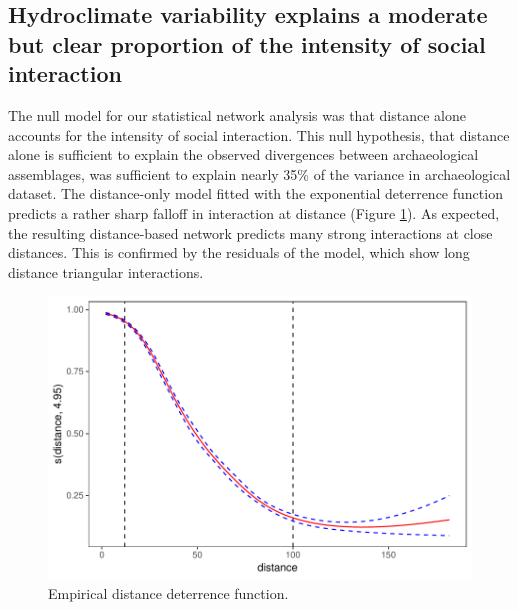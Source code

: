 \documentclass[10pt]{iopart}
\begin{document}



\subsection*{Hydroclimate variability explains a moderate but clear proportion of the intensity of social interaction}
The null model for our statistical network analysis was that distance alone accounts for the intensity of social interaction. This null hypothesis, that distance alone is sufficient to explain the observed divergences between archaeological assemblages, was sufficient to explain nearly 35\% of the variance in archaeological dataset. The distance-only model fitted with the exponential deterrence function predicts a rather sharp falloff in interaction at distance (Figure \ref{fig:distance}). As expected, the resulting distance-based network predicts many strong interactions at close distances. This is confirmed by the residuals of the model, which show long distance triangular interactions.

\begin{figure}[!htbp]
\centering
\includegraphics[width=\linewidth]{figures/distance_function.pdf}
\caption{Empirical distance deterrence function.}
\label{fig:distance}
\end{figure}
\end{document}
